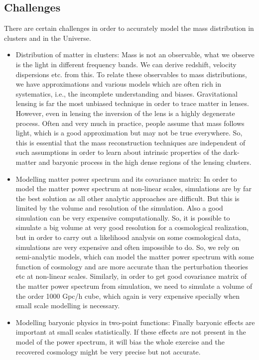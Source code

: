 \subsection{Challenges}

There are certain challenges in order to accurately model the mass distribution
in clusters and in the Universe. 

\begin{itemize}
	\item Distribution of matter in clusters: Mass is not an observable, what we 
			observe is the light in different frequency bands. We can derive 
			redshift, velocity dispersions etc. from this. To relate these observables
			to mass distributions, we have approximations and various models which
			are often rich in systematics, i.e., the incomplete understanding and 
			biases. Gravitational lensing is far the most unbiased technique in order
			to trace matter in lenses. However, even in lensing the inversion of the lens
			is a highly degenerate process. Often and very much in 
			practice, people assume that mass follows light, which is a good approximation
			but may not be true everywhere. So, this is essential that the 
			mass reconstruction techniques are independent of such assumptions in order
			to learn about intrinsic properties of the dark-matter and baryonic
			process in the high dense regions of the lensing clusters.

	\item Modelling matter power spectrum and its covariance matrix: In order to model
			the matter power spectrum at non-linear scales, simulations are by far the 
			best solution as all other analytic approaches are difficult. But this is limited
			by the volume and resolution of the simulation. Also a good simulation
			can be very expensive computationally. So, it is possible to simulate a big
			volume at very good resolution for a cosmological realization, but in order
			to carry out a likelihood analysis on some cosmological data, simulations are
			very expensive and often impossible to do. So, we rely on semi-analytic models, 
			which can model the matter power spectrum with some function of cosmology
			and are more accurate than the perturbation theories etc at non-linear 
			scales. Similarly, in order to get good covariance matrix of the matter power
			spectrum from simulation, we need to simulate a volume of the order 1000 Gpc/h
			cube, which again is very expensive specially when small scale modelling 
			is necessary. 

	\item Modelling baryonic physics in two-point functions: Finally baryonic effects are 
			important at small scales statistically. If these effects are not present
			in the model of the power spectrum, it will bias the whole exercise and
			the recovered cosmology might be very precise but not accurate. 
\end{itemize}

